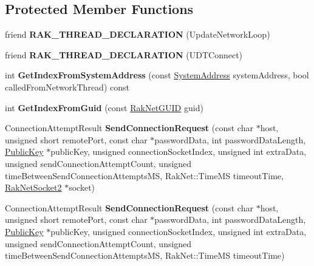 \subsection*{Protected Member Functions}
\begin{DoxyCompactItemize}
\item 
\hypertarget{class_rak_net_1_1_rak_peer_a641582137d2ef94bf97e0cd1c48245ae}{friend {\bfseries R\-A\-K\-\_\-\-T\-H\-R\-E\-A\-D\-\_\-\-D\-E\-C\-L\-A\-R\-A\-T\-I\-O\-N} (Update\-Network\-Loop)}\label{class_rak_net_1_1_rak_peer_a641582137d2ef94bf97e0cd1c48245ae}

\item 
\hypertarget{class_rak_net_1_1_rak_peer_a0de6e312866418bee26d5e01363197b6}{friend {\bfseries R\-A\-K\-\_\-\-T\-H\-R\-E\-A\-D\-\_\-\-D\-E\-C\-L\-A\-R\-A\-T\-I\-O\-N} (U\-D\-T\-Connect)}\label{class_rak_net_1_1_rak_peer_a0de6e312866418bee26d5e01363197b6}

\item 
\hypertarget{class_rak_net_1_1_rak_peer_adc3b9da140968236b0e0edbc04f1acf3}{int {\bfseries Get\-Index\-From\-System\-Address} (const \hyperlink{struct_rak_net_1_1_system_address}{System\-Address} system\-Address, bool called\-From\-Network\-Thread) const }\label{class_rak_net_1_1_rak_peer_adc3b9da140968236b0e0edbc04f1acf3}

\item 
\hypertarget{class_rak_net_1_1_rak_peer_a5d65d028301fe342734815cc26032ca1}{int {\bfseries Get\-Index\-From\-Guid} (const \hyperlink{struct_rak_net_1_1_rak_net_g_u_i_d}{Rak\-Net\-G\-U\-I\-D} guid)}\label{class_rak_net_1_1_rak_peer_a5d65d028301fe342734815cc26032ca1}

\item 
\hypertarget{class_rak_net_1_1_rak_peer_a5e2c621ac9312e4462fbc54badab10ab}{Connection\-Attempt\-Result {\bfseries Send\-Connection\-Request} (const char $\ast$host, unsigned short remote\-Port, const char $\ast$password\-Data, int password\-Data\-Length, \hyperlink{struct_rak_net_1_1_public_key}{Public\-Key} $\ast$public\-Key, unsigned connection\-Socket\-Index, unsigned int extra\-Data, unsigned send\-Connection\-Attempt\-Count, unsigned time\-Between\-Send\-Connection\-Attempts\-M\-S, Rak\-Net\-::\-Time\-M\-S timeout\-Time, \hyperlink{class_rak_net_1_1_rak_net_socket2}{Rak\-Net\-Socket2} $\ast$socket)}\label{class_rak_net_1_1_rak_peer_a5e2c621ac9312e4462fbc54badab10ab}

\item 
\hypertarget{class_rak_net_1_1_rak_peer_a764cf73970bec30bd813b1a6c34fc206}{Connection\-Attempt\-Result {\bfseries Send\-Connection\-Request} (const char $\ast$host, unsigned short remote\-Port, const char $\ast$password\-Data, int password\-Data\-Length, \hyperlink{struct_rak_net_1_1_public_key}{Public\-Key} $\ast$public\-Key, unsigned connection\-Socket\-Index, unsigned int extra\-Data, unsigned send\-Connection\-Attempt\-Count, unsigned time\-Between\-Send\-Connection\-Attempts\-M\-S, Rak\-Net\-::\-Time\-M\-S timeout\-Time)}\label{class_rak_net_1_1_rak_peer_a764cf73970bec30bd813b1a6c34fc206}


\end{DoxyCompactItemize}

